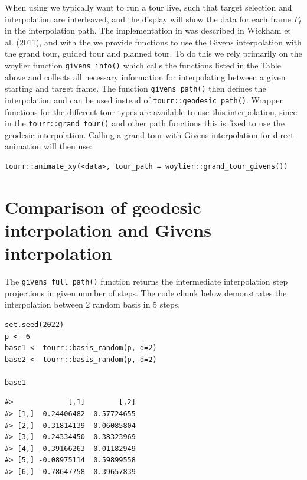 When using  we typically want to run a tour live, such that target selection and interpolation are interleaved, and the display will show the data for each frame \(F_t\) in the interpolation path. The implementation in  was described in Wickham et al. (2011), and with the  we provide functions to use the Givens interpolation with the grand tour, guided tour and planned tour. To do this we rely primarily on the woylier function \texttt{givens\_info()} which calls the functions listed in the Table above and collects all necessary information for interpolating between a given starting and target frame. The function \texttt{givens\_path()} then defines the interpolation and can be used instead of \texttt{tourr::geodesic\_path()}. Wrapper functions for the different tour types are available to use this interpolation, since in the \texttt{tourr::grand\_tour()} and other path functions this is fixed to use the geodesic interpolation. Calling a grand tour with Givens interpolation for direct animation will then use:

\begin{verbatim}
tourr::animate_xy(<data>, tour_path = woylier::grand_tour_givens())
\end{verbatim}

\hypertarget{comparison-of-geodesic-interpolation-and-givens-interpolation}{%
\section{Comparison of geodesic interpolation and Givens interpolation}\label{comparison-of-geodesic-interpolation-and-givens-interpolation}}

The \texttt{givens\_full\_path()} function returns the intermediate interpolation step projections in given number of steps. The code chunk below demonstrates the interpolation between 2 random basis in 5 steps.

\begin{verbatim}
set.seed(2022)
p <- 6
base1 <- tourr::basis_random(p, d=2)
base2 <- tourr::basis_random(p, d=2)

base1
\end{verbatim}

\begin{verbatim}
#>             [,1]        [,2]
#> [1,]  0.24406482 -0.57724655
#> [2,] -0.31814139  0.06085804
#> [3,] -0.24334450  0.38323969
#> [4,] -0.39166263  0.01182949
#> [5,] -0.08975114  0.59899558
#> [6,] -0.78647758 -0.39657839
\end{verbatim}

